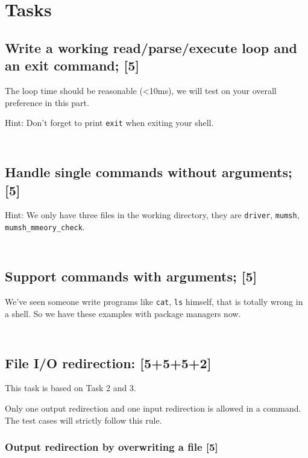 \documentclass[11pt,a4paper]{article}
\newcommand{\example}[2]{
\begin{tcolorbox}[colback=blue!5!white,colframe=blue!75!black,title=Example (#1)]
\begin{minipage}{0.48\linewidth}
\inputminted{shell}{#2.in}
\end{minipage}
\begin{minipage}{0.48\linewidth}
\inputminted{shell}{#2.out}
\end{minipage}
\end{tcolorbox}
}
\begin{document}
\section{Tasks}

\subsection{Write a working read/parse/execute loop and an exit command; [5] }

The loop time should be reasonable (<10ms), we will test on your overall preference in this part.

Hint: Don't forget to print \texttt{exit} when exiting your shell. \smallskip

\example{Milestone 1 Case 1}{../test/milestone1/case1}


\subsection{Handle single commands without arguments; [5]}

Hint: We only have three files in the working directory, they are \texttt{driver}, \texttt{mumsh}, \texttt{mumsh\_mmeory\_check}.\smallskip

\example{Milestone 1 Case 2}{../test/milestone1/case2}

\subsection{Support commands with arguments; [5]}

We've seen someone write programs like \texttt{cat}, \texttt{ls} himself, that is totally wrong in a shell. So we have these examples with package managers now.
\smallskip
\example{Milestone 1 Case 5}{../test/milestone1/case5}

\subsection{File I/O redirection: [5+5+5+2]}
This task is based on Task 2 and 3. \smallskip

Only one output redirection and one input redirection is allowed in a command. The test cases will strictly follow this rule.


\subsubsection{Output redirection by overwriting a file [5]}
\example{Milestone 1 Case 7}{../test/milestone1/case7}
\end{document}
